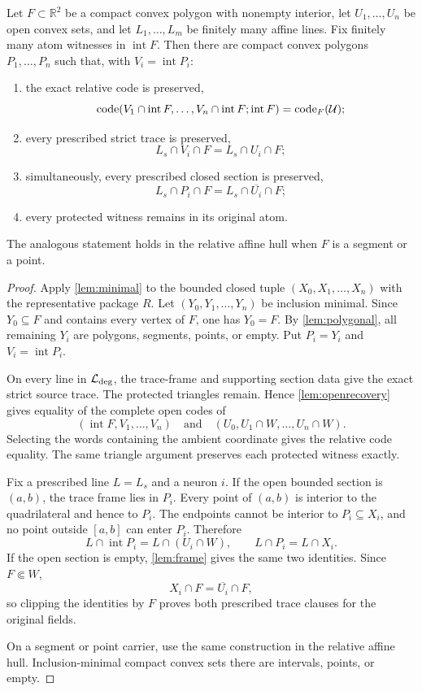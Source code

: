 \begin{theorem}\label{thm:main}
Let $F\subset\mathbb R^2$ be a compact convex polygon with nonempty
interior, let $U_1,\ldots,U_n$ be open convex sets, and let
$L_1,\ldots,L_m$ be finitely many affine lines.  Fix finitely many atom
witnesses in $\operatorname{int}F$.  Then there are compact convex polygons
$P_1,\ldots,P_n$ such that, with $V_i=\operatorname{int}P_i$:
\begin{enumerate}
\item the exact relative code is preserved,
\[
 \operatorname{code}(V_1\cap\operatorname{int}F,\ldots,
       V_n\cap\operatorname{int}F;\operatorname{int}F)
 =\operatorname{code}_F(\mathcal U);
\]
\item every prescribed strict trace is preserved,
\[
 L_s\cap V_i\cap F=L_s\cap U_i\cap F;
\]
\item simultaneously, every prescribed closed section is preserved,
\[
 L_s\cap P_i\cap F=L_s\cap\overline{U_i}\cap F;
\]
\item every protected witness remains in its original atom.
\end{enumerate}
The analogous statement holds in the relative affine hull when $F$ is a
segment or a point.
\end{theorem}

\begin{proof}
Apply \cref{lem:minimal} to the bounded closed tuple
$(X_0,X_1,\ldots,X_n)$ with the representative package $R$.  Let
$(Y_0,Y_1,\ldots,Y_n)$ be inclusion minimal.  Since $Y_0\subseteq F$ and
contains every vertex of $F$, one has $Y_0=F$.  By
\cref{lem:polygonal}, all remaining $Y_i$ are polygons, segments, points,
or empty.  Put $P_i=Y_i$ and $V_i=\operatorname{int}P_i$.

On every line in $\mathcal L_{\rm deg}$, the trace-frame and supporting
section data give the exact strict source trace.  The protected triangles
remain.  Hence \cref{lem:openrecovery} gives equality of the complete open
codes of
\[
 (\operatorname{int}F,V_1,\ldots,V_n)
 \quad\text{and}\quad
 (U_0,U_1\cap W,\ldots,U_n\cap W).
\]
Selecting the words containing the ambient coordinate gives the relative
code equality.  The same triangle argument preserves each protected
witness exactly.

Fix a prescribed line $L=L_s$ and a neuron $i$.  If the open bounded
section is $(a,b)$, the trace frame lies in $P_i$.  Every point of $(a,b)$
is interior to the quadrilateral and hence to $P_i$.  The endpoints cannot
be interior to $P_i\subseteq X_i$, and no point outside $[a,b]$ can enter
$P_i$.  Therefore
\[
 L\cap\operatorname{int}P_i=L\cap(U_i\cap W),
 \qquad L\cap P_i=L\cap X_i.
\]
If the open section is empty, \cref{lem:frame} gives the same two
identities.  Since $F\Subset W$,
\[
 X_i\cap F=\overline{U_i}\cap F,
\]
so clipping the identities by $F$ proves both prescribed trace clauses for
the original fields.

On a segment or point carrier, use the same construction in the relative
affine hull.  Inclusion-minimal compact convex sets there are intervals,
points, or empty.
\end{proof}

